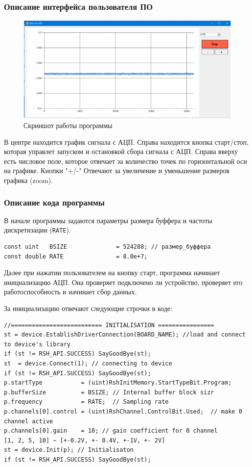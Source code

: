 \documentclass[../paper.tex]{subfiles}
\begin{document}
\subsubsection{Описание интерфейса пользователя ПО} 
\begin{figure}[H]
\centering
\includegraphics[width=\textwidth]{images/screenshot.png}
\caption{Скриншот работы программы}
\end{figure}
В центре находится график сигнала с АЦП. Справа находится кнопка старт/стоп, которая управлет запуском и остановкой сбора сигнала с АЦП. Справа вверху есть числовое поле, которое отвечает за количество точек по горизонтальной оси на графике. Кнопки "+/-" Отвечают за увеличение и уменьшение размеров графика (zoom).

\subsubsection{Описание кода программы}
В начале программы задаются параметры размера буффера и частоты дискретизации (\lstinline|RATE|).
\begin{lstlisting}
const uint   BSIZE              = 524288; // размер_буффера
const double RATE               = 8.0e+7;
\end{lstlisting}


Далее при нажатии пользователем на кнопку старт, программа начинает инициализацию АЦП. Она проверяет подключено ли устройство, проверяет его работоспособность и начинает сбор данных.

За инициализацию отвечают следующие строчки в коде:

\begin{lstlisting}
//========================== INITIALISATION ================        
st = device.EstablishDriverConnection(BOARD_NAME); //load and connect to device's library
if (st != RSH_API.SUCCESS) SayGoodBye(st);
st  = device.Connect(1); // connecting to device
if (st != RSH_API.SUCCESS) SayGoodBye(st);
p.startType           = (uint)RshInitMemory.StartTypeBit.Program;  
p.bufferSize          = BSIZE; // Internal buffer block sizr
p.frequency           = RATE;  // Sampling rate
p.channels[0].control = (uint)RshChannel.ControlBit.Used;  // make 0 channel active
p.channels[0].gain    = 10; // gain coefficient for 0 channel
[1, 2, 5, 10] ~ [+-0.2V, +- 0.4V, +-1V, +- 2V]
st = device.Init(p); // Initialisaton 
if (st != RSH_API.SUCCESS) SayGoodBye(st);
\end{lstlisting}
\end{document}

